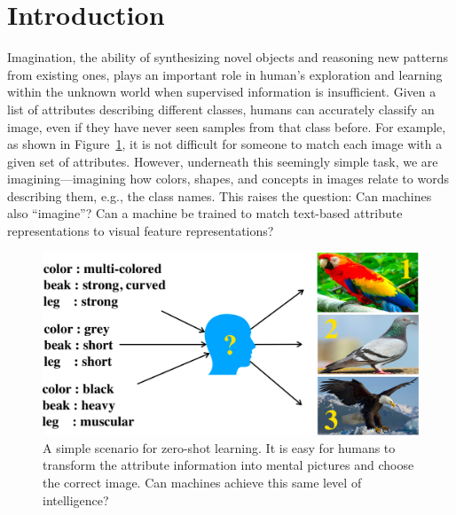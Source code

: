 \documentclass[letterpaper]{article}
\begin{document}
\section{Introduction}
Imagination, the ability of synthesizing novel objects and reasoning new patterns from existing ones, plays an important role in human's exploration and learning within the unknown world when supervised information is insufficient.
Given a list of attributes describing different classes, humans can accurately classify an image, even if they have never seen samples from that class before.
For example, as shown in Figure~\ref{fig:zero-shot-simple}, it is not difficult for someone to match each image with a given set of attributes.
However, underneath this seemingly simple task, we are imagining---imagining how colors, shapes, and concepts in images relate to words describing them, e.g., the class names. This raises the question: Can machines also ``imagine''? Can a machine be trained to match text-based attribute representations to visual feature representations?
\begin{figure}[t!]
\begin{center}
\includegraphics[width=0.9\columnwidth]{zero-shot-example-v2-crop-.pdf}
\end{center}
\caption{A simple scenario for zero-shot learning.
It is easy for humans to transform the attribute information into mental pictures and choose the correct image. Can machines achieve this same level of intelligence?}
\label{fig:zero-shot-simple}
\end{figure}
\end{document}

